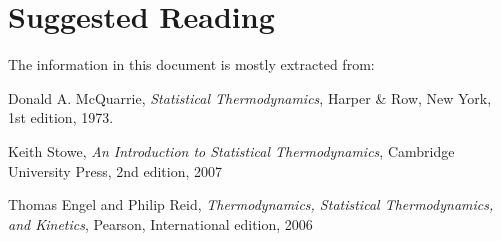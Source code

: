\documentclass[a4paper,12pt,titlepage]{article}
\begin{document}
\section{Suggested Reading}
The information in this document is mostly extracted from:
\begin{thebibliography}{9}

  Donald A. McQuarrie,
  \textit{Statistical Thermodynamics},
  Harper \& Row, New York,
  1st edition,
  1973.
  
  Keith Stowe,
  \textit{An Introduction to Statistical Thermodynamics},
  Cambridge University Press,
  2nd edition,
  2007
  
 Thomas Engel and Philip Reid,
 \textit{Thermodynamics, Statistical Thermodynamics, and Kinetics},
  Pearson,
  International edition,
  2006
  
\end{thebibliography}
\end{document}
